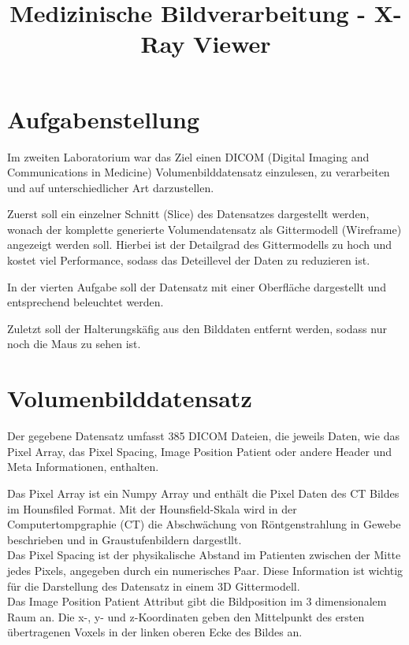\documentclass[conference]{IEEEtran}
\begin{document}
\title{Medizinische Bildverarbeitung - X-Ray Viewer}

\author{
}

\maketitle

\section{Aufgabenstellung}
Im zweiten Laboratorium war das Ziel einen DICOM (Digital Imaging and Communications in Medicine) Volumenbilddatensatz einzulesen, zu verarbeiten und auf unterschiedlicher Art darzustellen.

Zuerst soll ein einzelner Schnitt (Slice) des Datensatzes dargestellt werden, wonach der komplette generierte Volumendatensatz als Gittermodell (Wireframe) angezeigt werden soll. Hierbei ist der Detailgrad des Gittermodells zu hoch und kostet viel Performance, sodass das Deteillevel der Daten zu reduzieren ist.

In der vierten Aufgabe soll der Datensatz mit einer Oberfläche dargestellt und entsprechend beleuchtet werden.

Zuletzt soll der Halterungskäfig aus den Bilddaten entfernt werden, sodass nur noch die Maus zu sehen ist.

\section{Volumenbilddatensatz}

Der gegebene Datensatz umfasst 385 DICOM Dateien, die jeweils Daten, wie das Pixel Array, das Pixel Spacing, Image Position Patient oder andere Header und Meta Informationen, enthalten.

Das Pixel Array ist ein Numpy Array und enthält die Pixel Daten des CT Bildes im Hounsfiled Format. Mit der Hounsfield-Skala wird in der Computertompgraphie (CT) die Abschwächung von Röntgenstrahlung in Gewebe beschrieben und in Graustufenbildern dargestllt. \cite{wiki:HU} \\
Das Pixel Spacing ist der physikalische Abstand im Patienten zwischen der Mitte jedes Pixels, angegeben durch ein numerisches Paar. Diese Information ist wichtig für die Darstellung des Datensatz in einem 3D Gittermodell. \\
Das Image Position Patient Attribut gibt die Bildposition im 3 dimensionalem Raum an. Die x-, y- und z-Koordinaten geben den Mittelpunkt des ersten übertragenen Voxels in der linken oberen Ecke des Bildes an.\cite{pixel_spacing} \\
\end{document}
